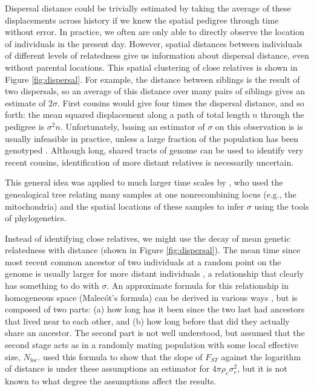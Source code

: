 \documentclass{ar-1col}
\begin{document}
Dispersal distance could be trivially estimated by taking
the average of these displacements across history
if we knew the spatial pedigree through time without error.
In practice, we often are only able to directly observe
the location of individuals in the present day.
However, 
spatial distances between individuals of different levels of relatedness
give us information about dispersal distance, even without parental locations.
This spatial clustering of close relatives
is shown in Figure \ref{fig:dispersal}.
For example,
the distance between siblings is the result of two dispersals,
so an average of this distance over many pairs of siblings 
gives an estimate of $2 \sigma$.
First cousins would give four times the dispersal distance, and so forth:
the mean squared displacement along
a path of total length $n$ through the pedigree is $\sigma^2 n$.
Unfortunately, basing an estimator of $\sigma$ on this observation
is is usually infeasible in practice,
unless a large fraction of the population has been genotyped
\citep[e.g.,][]{Aguillon2017deconstructing}.
Although long, shared tracts of genome can be used to identify very recent cousins,
identification of more distant relatives is necessarily uncertain.

This general idea was applied to much larger time scales by \citep{neigel1991estimation,neigel1993application},
who used the genealogical tree relating many samples at one nonrecombining locus
(e.g., the mitochondria) and the spatial locations of these samples
to infer $\sigma$ using the tools of phylogenetics.

Instead of identifying close relatives,
we might use the decay of mean genetic relatedness with distance
(shown in Figure \ref{fig:dispersal}).
The mean time since most recent common ancestor 
of two individuals at a random point on the genome
is usually larger for more distant individuals \citep{ibd_review},
a relationship that clearly has something to do with $\sigma$.
An approximate formula for this relationship
in homogeneous space (Malec\'ot's formula)
can be derived in various ways 
\citep{malecot, sawyer1976branching, rousset_1997, barton-depaulis-etheridge, robledoarnuncio, ringbauer2017inferring, alasadi2018estimating},
but is composed of two parts: 
(a) how long has it been since the two last had ancestors that lived near to each other,
and (b) how long before that did they actually share an ancestor.
The second part is not well understood,
but \citet{malecot} assumed that the second stage acts as in a randomly mating population
with some local effective size, $N_\text{loc}$.
\citet{rousset_1997} used this formula to show that
the slope of $F_{ST}$ against the logarithm of distance
is under these assumptions an estimator for $4 \pi \rho_e \sigma_e^2$,
but it is not known to what degree the assumptions affect the results.
\end{document}
